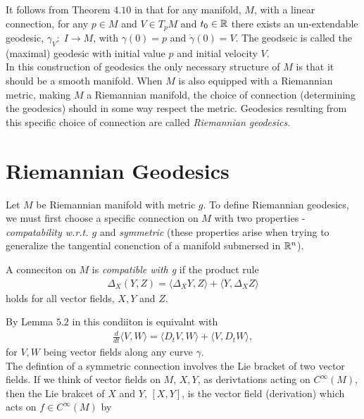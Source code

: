 It follows from Theorem $4.10$ in  that for any manifold, $M$, with a linear connection, for any $p \in M$ and $V \in T_pM$ and $t_0 \in \mathbb{R}$ there exists an un-extendable geodesic, $\gamma_V: \; I \rightarrow M$, with $\gamma(0) = p$ and $\dot{\gamma}(0) = V$. The geodseic is called the (maximal) geodesic with initial value $p$ and initial velocity $V$. \\[0.2 cm]

In this construction of geodesics the only necessary structure of $M$ is that it should be a smooth manifold. When $M$ is also equipped with a Riemannian metric, making $M$ a Riemannian manifold, the choice of connection (determining the geodesics) should in some way respect the metric. Geodesics resulting from this specific choice of connection are called \textit{Riemannian geodesics}.

\section{Riemannian Geodesics}

Let $M$ be Riemannian manifold with metric $g$. To define Riemannian geodesics, we must first choose a specific connection on $M$ with two properties - \textit{compatability w.r.t. $g$} and \textit{symmetric} (these properties arise when trying to generalize the tangential conenction of a manifold submersed in $\mathbb{R}^n$).

\begin{definition}
A conneciton on $M$ is \textit{compatible with g} if the product rule
\begin{align*}
\Delta_X (Y, Z) = \langle \Delta_X Y, Z \rangle + \langle Y, \Delta_X Z \rangle
\end{align*}
holds for all vector fields, $X, Y$ and $Z$.
\end{definition}

By Lemma $5.2$ in  this condiiton is equivalnt with
\begin{align*}
\frac{d}{dt} \langle V, W \rangle = \langle D_t V, W \rangle + \langle V, D_t W \rangle,
\end{align*} 
for $V, W$ being vector fields along any curve $\gamma$. \\[0.2 cm]

The defintion of a symmetric connection involves the Lie bracket of two vector fields. If we think of vector fields on $M$, $X, Y$, as derivtations acting on $C^\infty (M)$, then the Lie brakcet of $X$ and $Y$, $[X , Y]$, is the vector field (derivation) which acts on $f \in C^\infty (M)$ by

